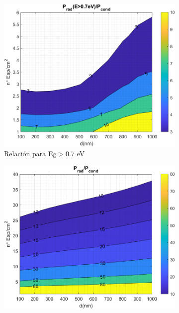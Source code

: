 \begin{figure}[H]
	\centering
	\begin{subfigure}[b]{0.49\textwidth}
		\centering
		\includegraphics[width=1.00\textwidth]{figuras/Resultados/RelacionCondRad/SiSi.png}
		\caption{Relación para Eg$>$0.7 eV}
		\label{fig:rel_SiSiO2Si}
	\end{subfigure}
	\hfill
	\begin{subfigure}[b]{0.49\textwidth}
		\centering
		\includegraphics[width=1.00\textwidth]{figuras/Resultados/RelacionCondRad/SiSi_full.png}

\end{subfigure}
\end{figure}
